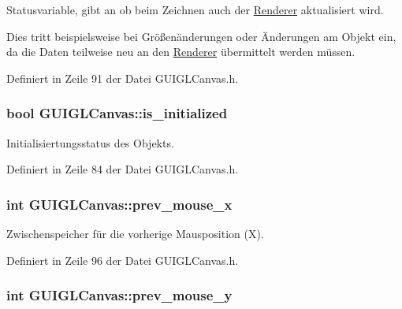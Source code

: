 Statusvariable, gibt an ob beim Zeichnen auch der \hyperlink{classRenderer}{Renderer} aktualisiert wird. 

Dies tritt beispielsweise bei Größenänderungen oder Änderungen am Objekt ein, da die Daten teilweise neu an den \hyperlink{classRenderer}{Renderer} übermittelt werden müssen. 

Definiert in Zeile 91 der Datei G\-U\-I\-G\-L\-Canvas.\-h.

\hypertarget{classGUIGLCanvas_a59e01564652765dec69e7097c10b4455}{
\subsubsection[{is\-\_\-initialized}]{\setlength{\rightskip}{0pt plus 5cm}bool G\-U\-I\-G\-L\-Canvas\-::is\-\_\-initialized\hspace{0.3cm}{\ttfamily [private]}}}\label{classGUIGLCanvas_a59e01564652765dec69e7097c10b4455}


Initialisiertungsstatus des Objekts. 



Definiert in Zeile 84 der Datei G\-U\-I\-G\-L\-Canvas.\-h.

\hypertarget{classGUIGLCanvas_afc22c47a62b8d5b165a22d059816ee22}{
\subsubsection[{prev\-\_\-mouse\-\_\-x}]{\setlength{\rightskip}{0pt plus 5cm}int G\-U\-I\-G\-L\-Canvas\-::prev\-\_\-mouse\-\_\-x\hspace{0.3cm}{\ttfamily [private]}}}\label{classGUIGLCanvas_afc22c47a62b8d5b165a22d059816ee22}


Zwischenspeicher für die vorherige Mausposition (X). 



Definiert in Zeile 96 der Datei G\-U\-I\-G\-L\-Canvas.\-h.

\hypertarget{classGUIGLCanvas_a684c82bd591f01b5f600c9589158e0e0}{
\subsubsection[{prev\-\_\-mouse\-\_\-y}]{\setlength{\rightskip}{0pt plus 5cm}int G\-U\-I\-G\-L\-Canvas\-::prev\-\_\-mouse\-\_\-y\hspace{0.3cm}{\ttfamily [private]}}}\label{classGUIGLCanvas_a684c82bd591f01b5f600c9589158e0e0}


